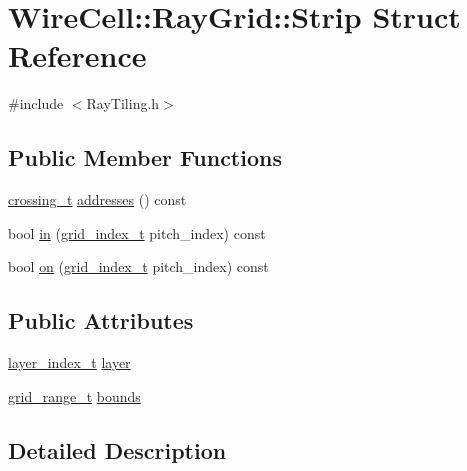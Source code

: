 \hypertarget{struct_wire_cell_1_1_ray_grid_1_1_strip}{}\section{Wire\+Cell\+:\+:Ray\+Grid\+:\+:Strip Struct Reference}
\label{struct_wire_cell_1_1_ray_grid_1_1_strip}


{\ttfamily \#include $<$Ray\+Tiling.\+h$>$}

\subsection*{Public Member Functions}
\begin{DoxyCompactItemize}
\item 
\hyperlink{namespace_wire_cell_1_1_ray_grid_ad8870c962588c4492b1f7c5ad1552a7e}{crossing\+\_\+t} \hyperlink{struct_wire_cell_1_1_ray_grid_1_1_strip_af63704a302c0546741e404597b3525a1}{addresses} () const
\item 
bool \hyperlink{struct_wire_cell_1_1_ray_grid_1_1_strip_af466f06e09261f5e227dce9dd9db21db}{in} (\hyperlink{namespace_wire_cell_1_1_ray_grid_ae97b5b26d015cd99f7d4566f3a7310d0}{grid\+\_\+index\+\_\+t} pitch\+\_\+index) const
\item 
bool \hyperlink{struct_wire_cell_1_1_ray_grid_1_1_strip_a58e88dde7d1625b433f25ce5978b4216}{on} (\hyperlink{namespace_wire_cell_1_1_ray_grid_ae97b5b26d015cd99f7d4566f3a7310d0}{grid\+\_\+index\+\_\+t} pitch\+\_\+index) const
\end{DoxyCompactItemize}
\subsection*{Public Attributes}
\begin{DoxyCompactItemize}
\item 
\hyperlink{namespace_wire_cell_1_1_ray_grid_ab7562e54b58eede813d5b70b5eb85812}{layer\+\_\+index\+\_\+t} \hyperlink{struct_wire_cell_1_1_ray_grid_1_1_strip_a091250389d959d985e79a6efb9459f79}{layer}
\item 
\hyperlink{namespace_wire_cell_1_1_ray_grid_a4f0a195ceaa41bf0c9d13f0c81309633}{grid\+\_\+range\+\_\+t} \hyperlink{struct_wire_cell_1_1_ray_grid_1_1_strip_ac897615a8958d7dabd48038ea046f2a1}{bounds}
\end{DoxyCompactItemize}


\subsection{Detailed Description}


